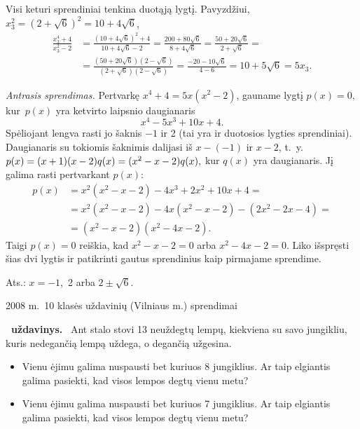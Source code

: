 \documentclass[11pt,a4paper]{article}
\newcommand{\hm}[1]{\nobreak\hspace{0pt}#1\nobreak\hspace{0pt}}
\newcounter{uzdavinys}
\newenvironment{uzdavinys}
  {\refstepcounter{uzdavinys}\par\medskip\noindent\textbf{\theuzdavinys\ uždavinys.}\ }
  {\par\medskip}
\begin{document}
Visi keturi sprendiniai tenkina duotąją lygtį. Pavyzdžiui, $x_3^2=\left(2+\sqrt{6}\right)^2=10+4\sqrt{6}$, \begin{align*}\frac{x_3^4+4}{x_3^2-2}&=\frac{\left(10+4\sqrt{6}\right)^2+4}{10+4\sqrt{6}-2}=\frac{200+80\sqrt{6}}{8+4\sqrt{6}}=\frac{50+20\sqrt{6}}{2+\sqrt{6}}=\\&=\frac{\left(50+20\sqrt{6}\right)\left(2-\sqrt{6}\right)}{\left(2+\sqrt{6}\right)\left(2-\sqrt{6}\right)}=\frac{-20-10\sqrt{6}}{4-6}=10+5\sqrt{6}=5x_3.\end{align*}

 \vspace{0,3cm} 
 
 \textit{Antrasis sprendimas.} Pertvarkę $x^4+4=5x(x^2-2)$, gauname lygtį
 $p(x)=0,$ kur~$p(x)$ yra ketvirto laipsnio daugianaris $$x^4-5x^3+10x+4.$$ Spėliojant lengva rasti jo šaknis $-1$ ir 2 (tai yra ir duotosios lygties sprendiniai). Daugianaris su tokiomis šaknimis dalijasi iš $x-(-1)$ ir $x-2$, t.~y.
 $p(x)=(x+1)(x-2)q(x)\hm=(x^2-x-2)q(x),$ kur $q(x)$ yra daugianaris. Jį galima rasti pertvarkant $p(x)$:\begin{align*}p(x)&=x^2(x^2-x-2)-4x^3+2x^2+10x+4=\\&=
 x^2(x^2-x-2)-4x(x^2-x-2)-(2x^2-2x-4)=\\&=(x^2-x-2)(x^2-4x-2).\end{align*} Taigi $p(x)=0$ reiškia, kad $x^2-x-2=0$ arba $x^2-4x-2=0$. Liko išspręsti šias dvi lygtis ir patikrinti gautus sprendinius kaip pirmajame sprendime.

\begin{flushright}
Ats.: $x=-1$, \,2 arba $2\pm\sqrt{6}$.
\end{flushright}
 \vspace{0,7cm}

\begin{center}\label{dvu}
{\sc\large 2008 m.~10 klasės uždavinių (Vilniaus m.) sprendimai}
\end{center}
\vspace{0,3cm}


\setcounter{uzdavinys}{0}


\begin{uzdavinys}
Ant stalo stovi 13 neuždegtų lempų, kiekviena su savo jungikliu, kuris nedegančią lempą uždega, o degančią užgesina.
\begin{itemize}
\item[a)] Vienu ėjimu galima nuspausti bet kuriuos 8 jungiklius. Ar taip elgiantis galima pasiekti, kad visos lempos degtų vienu metu?
\item[b)] Vienu ėjimu galima nuspausti bet kuriuos 7 jungiklius. Ar taip elgiantis galima pasiekti, kad visos lempos degtų vienu metu?
\end{itemize}
\end{uzdavinys}
\end{document}
